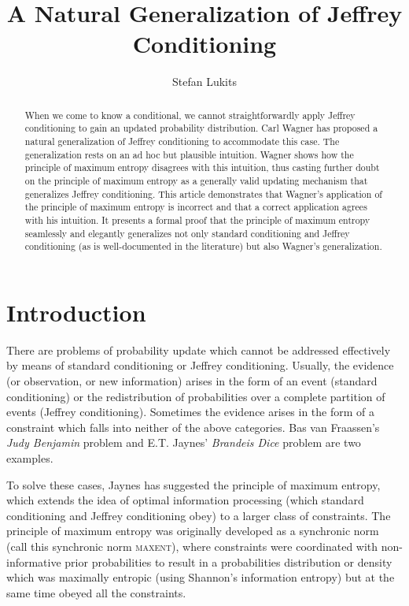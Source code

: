 \documentclass[11pt]{article}
\begin{document}

\title{A Natural Generalization of Jeffrey Conditioning}
\author{Stefan Lukits}

\date{}



\begin{abstract} 
  {\noindent}When we come to know a conditional, we cannot
  straightforwardly apply Jeffrey conditioning to gain an updated
  probability distribution. Carl Wagner has proposed a natural
  generalization of Jeffrey conditioning to accommodate this case. The
  generalization rests on an ad hoc but plausible intuition. Wagner
  shows how the principle of maximum entropy disagrees with this
  intuition, thus casting further doubt on the principle of maximum
  entropy as a generally valid updating mechanism that generalizes
  Jeffrey conditioning. This article demonstrates that Wagner's
  application of the principle of maximum entropy is incorrect and
  that a correct application agrees with his intuition. It presents a
  formal proof that the principle of maximum entropy seamlessly and
  elegantly generalizes not only standard conditioning and Jeffrey
  conditioning (as is well-documented in the literature) but also
  Wagner's generalization.
\end{abstract}

\section{Introduction}
\label{Introduction}

There are problems of probability update which cannot be addressed
effectively by means of standard conditioning or Jeffrey conditioning.
Usually, the evidence (or observation, or new information) arises in
the form of an event (standard conditioning) or the redistribution of
probabilities over a complete partition of events (Jeffrey
conditioning). Sometimes the evidence arises in the form of a
constraint which falls into neither of the above categories. Bas van
Fraassen's \emph{Judy Benjamin} problem and E.T. Jaynes'
\emph{Brandeis Dice} problem are two examples. 

To solve these cases, Jaynes has suggested the principle of maximum
entropy, which extends the idea of optimal information processing
(which standard conditioning and Jeffrey conditioning obey) to a
larger class of constraints. The principle of maximum entropy was
originally developed as a synchronic norm (call this synchronic norm
\textsc{maxent}), where constraints were coordinated with
non-informative prior probabilities to result in a probabilities
distribution or density which was maximally entropic (using Shannon's
information entropy) but at the same time obeyed all the constraints.
\end{document}
